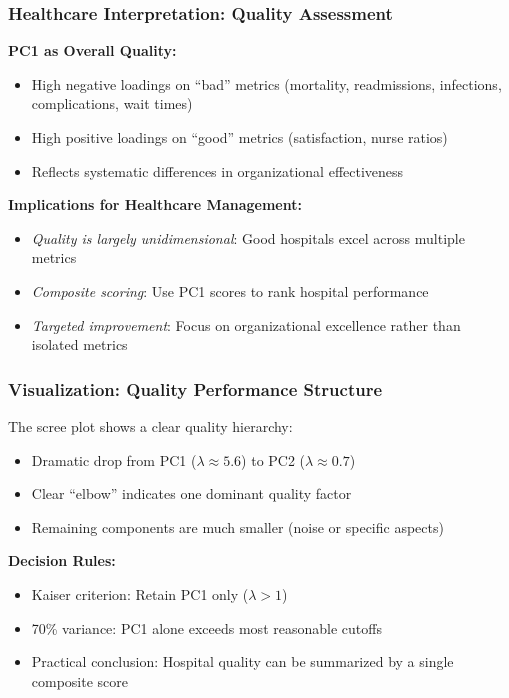 \documentclass[aspectratio=169]{beamer}
\begin{document}
\begin{frame}
    \frametitle{Healthcare Interpretation: Quality Assessment}
    \textbf{PC1 as Overall Quality:}
    \begin{itemize}
        \item High negative loadings on ``bad'' metrics (mortality, readmissions, infections, complications, wait times) \pause
        \item High positive loadings on ``good'' metrics (satisfaction, nurse ratios) \pause
        \item Reflects systematic differences in organizational effectiveness \pause
    \end{itemize}
    \vspace{12pt}
    \textbf{Implications for Healthcare Management:}
    \begin{itemize}
        \item \textit{Quality is largely unidimensional}: Good hospitals excel across multiple metrics \pause
        \item \textit{Composite scoring}: Use PC1 scores to rank hospital performance \pause
        \item \textit{Targeted improvement}: Focus on organizational excellence rather than isolated metrics \pause
    \end{itemize}
\end{frame}

\begin{frame}
    \frametitle{Visualization: Quality Performance Structure}
    The scree plot shows a clear quality hierarchy:
    \begin{itemize}
        \item Dramatic drop from PC1 ($\lambda \approx 5.6$) to PC2 ($\lambda \approx 0.7$) \pause
        \item Clear ``elbow'' indicates one dominant quality factor \pause
        \item Remaining components are much smaller (noise or specific aspects) \pause
    \end{itemize}
    \vspace{12pt}
    \textbf{Decision Rules:}
    \begin{itemize}
        \item Kaiser criterion: Retain PC1 only ($\lambda > 1$) \pause
        \item 70\% variance: PC1 alone exceeds most reasonable cutoffs \pause
        \item Practical conclusion: Hospital quality can be summarized by a single composite score \pause
    \end{itemize}
\end{frame}
\end{document}

